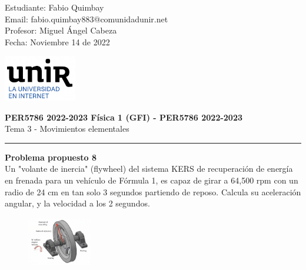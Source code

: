 \documentclass[11pt,letterpaper]{article}
\begin{document}
\pagestyle{plain}

\begin{flushleft}
Estudiante: Fabio Quimbay\\
Email: fabio.quimbay883@comunidadunir.net\\
Profesor: Miguel Ángel Cabeza\\
Fecha: Noviembre 14 de 2022\\
\end{flushleft}

\begin{flushright}\vspace{-20mm}
\includegraphics[height=2cm]{logo.png}
\end{flushright}
 
\begin{center}\vspace{0cm}
\textbf{\large PER5786 2022-2023  Física 1 (GFI) - PER5786 2022-2023}\\
 Tema 3 - Movimientos elementales
\end{center}

 
\rule{\linewidth}{0.1mm}

\bigskip
\bigskip

\textbf{Problema propuesto 8}\\

Un "volante de inercia" (flywheel) del sistema KERS de recuperación de energía en frenada para un vehículo de Fórmula 1, es capaz de girar a 64,500 rpm con un radio de 24 cm en tan solo 3 segundos partiendo de reposo. Calcula su aceleración angular, y la velocidad a los 2 segundos.

\begin{figure}
\begin{center}
\includegraphics[width=0.25\textwidth]{problema_8.png}
\end{center}
\end{figure}
\end{document}
